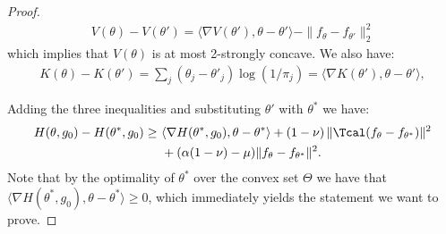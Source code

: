 \documentclass[12pt]{extarticle} %
\begin{document}
\begin{proof}
\begin{align*}
    V(\theta)-V(\theta') = \langle \nabla V(\theta'), \theta - \theta' \rangle - \|f_{\theta}-f_{\theta'}\|_{2}^2
\end{align*}
which implies that $V(\theta)$ is at most 2-strongly concave. 
We also have:
\begin{align*}
    K(\theta) - K(\theta') = \sum_j (\theta_j - \theta'_j) \log(1/\pi_j) = \langle \nabla K(\theta'), \theta - \theta' \rangle,
\end{align*}

Adding the three inequalities and substituting $\theta'$ with $\theta^*$ we have:
\begin{align*}
        H(\theta, g_0) - H(\theta^*, g_0) \geq~& \langle \nabla H(\theta^*, g_0), \theta-\theta^* \rangle + \left(1-\nu \right) \|\Tcal(f_{\theta} - f_{\theta^*})\|^2\\
        ~&+ (\alpha(1-\nu)-\mu)\|f_{\theta} - f_{\theta^*}\|^2.
\end{align*}
Note that by the optimality of $\theta^*$ over the convex set $\Theta$ we have that $\langle \nabla H(\theta^*, g_0), \theta-\theta^* \rangle \geq 0$, which immediately yields the statement we want to prove.
\end{proof}
\end{document}
